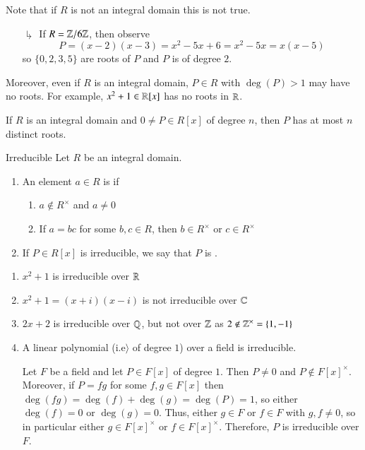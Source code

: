 \documentclass[12pt, a4paper, twoside, openright, titlepage]{book}
\begin{document}
\begin{rmk}{}{}
    Note that if $R$ is not an integral domain this is not true.
    \begin{enumerate}
        \item[$\drsh$] If $R = \mathbb Z/6\mathbb Z$, then observe $$P = (x-2)(x-3) = x^2-5x+6 = x^2-5x = x(x-5)$$ 
        so $\{0,2,3,5\}$ are roots of $P$ and $P$ is of degree $2$.
    \end{enumerate}
    Moreover, even if $R$ is an integral domain, $P \in R$ with $\deg(P) > 1$ may have no roots. For example, $x^2+1 \in \mathbb R[x]$ has no roots in $\mathbb R$.
\end{rmk}

\begin{cor}{}{}
    If $R$ is an integral domain and $0 \neq P \in R[x]$ of degree $n$, then $P$ has at most $n$ distinct roots.
\end{cor}

\begin{defn}{Irreducible}{}
    Let $R$ be an integral domain.
    \begin{enumerate}
        \item An element $a \in R$ is  if
        \begin{enumerate}
            \item $a \notin R^{\times}$ and $a \neq 0$
            \item If $a =bc$ for some $b,c \in R$, then $b \in R^{\times}$ or $c \in R^{\times}$
        \end{enumerate}
        \item If $P \in R[x]$ is irreducible, we say that $P$ is .
    \end{enumerate}
\end{defn}

\begin{eg}{}{}
    \leavevmode
    \begin{enumerate}
        \item $x^2+1$ is irreducible over $\mathbb R$
        \item $x^2+1 = (x+i)(x-i)$ is not irreducible over $\mathbb C$
        \item $2x+2$ is irreducible over $\mathbb Q$, but not over $\mathbb Z$ as $2 \notin \mathbb Z^{\times} = \{1,-1\}$
        \item A linear polynomial (i.e$\rangle$ of degree $1$) over a field is irreducible.
        \begin{proof*}{}{}
            Let $F$ be a field and let $P \in F[x]$ of degree $1$. Then $P \neq 0$ and $P \notin F[x]^{\times}$. Moreover, if $P = fg$ for some $f,g \in F[x]$ then $\deg(fg) = \deg(f)+\deg(g) = \deg(P) = 1$, so either $\deg(f) = 0$ or $\deg(g) = 0$. Thus, either $g \in F$ or $f \in F$ with $g,f \neq 0$, so in particular either $g \in F[x]^{\times}$ or $f \in F[x]^{\times}$. Therefore, $P$ is irreducible over $F$.
        \end{proof*}
    \end{enumerate}
\end{eg}
\end{document}
